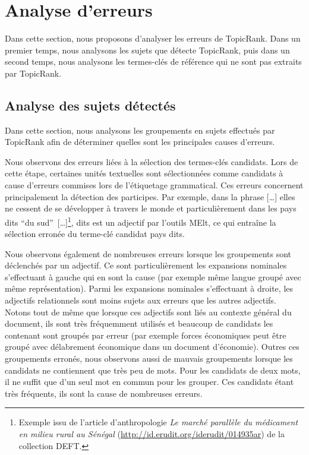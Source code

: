 \section{Analyse d'erreurs}
\label{sec:analyse_d_erreurs}
  Dans cette section, nous proposons d'analyser les erreurs de TopicRank. Dans
  un premier temps, nous analysons les sujets que détecte TopicRank, puis dans
  un second temps, nous analysons les termes-clés de référence qui ne sont pas
  extraits par Topic\-Rank.

  \subsection{Analyse des sujets détectés}
  \label{subsec:analyse_des_sujets_générés}
    Dans cette section, nous analysons les groupements en sujets effectués par
    Topic\-Rank afin de déterminer quelles sont les principales causes
    d'erreurs.

    Nous observons des erreurs liées à la sélection des
    termes-clés candidats. Lors de cette étape, certaines unités textuelles sont
    sélectionnées comme candidats à cause d'erreurs commises lors de l'étiquetage
    grammatical. Ces erreurs concernent principalement la détection des participes. Par exemple, dans la
    phrase \og{}[\dots] elles ne cessent de se développer à travers le monde et
    particulièrement dans les pays dits ``du sud''~[\dots]\fg{}\footnote{Exemple
    issu de l'article d'anthropologie \textit{Le marché parallèle du médicament
    en milieu rural au Sénégal} (\url{http://id.erudit.org/iderudit/014935ar})
    de la collection DEFT.}, \og{}dits\fg{} est un adjectif
    par l'outils MElt, ce qui entraîne la sélection erronée du terme-clé
    candidat \og{}pays dits\fg{}.

    Nous observons également de nombreuses erreurs lorsque les
    groupements sont déclenchés par un adjectif. Ce sont particulièrement les
    expansions nominales s'effectuant à gauche qui en sont la cause (par exemple
    \og{}même langue\fg{} groupé avec \og{}même représentation\fg{}). Parmi les
    expansions nominales s'effectuant à droite, les adjectifs relationnels sont
    moins sujets aux erreurs que les autres adjectifs. Notons tout de même que
    lorsque ces adjectifs sont liés au contexte général du document, ils sont
    très fréquemment utilisés et beaucoup de candidats les contenant sont
    groupés par erreur (par exemple \og{}forces économiques\fg{} peut être groupé 
    avec \og{}délabrement économique\fg{} dans un document d'économie). Outres
    ces groupements erronés, nous observons aussi de mauvais groupements lorsque
    les candidats ne contiennent que très peu de mots. Pour les candidats de
    deux mots, il ne suffit que d'un seul mot en commun pour les grouper. Ces
    candidats étant très fréquents, ils sont la cause de nombreuses erreurs.


